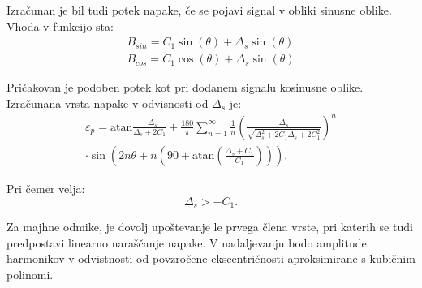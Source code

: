 Izračunan je bil tudi potek napake, če se pojavi signal v obliki sinusne oblike. Vhoda v funkcijo sta:
\begin{eqnarray}
\label{ys_analit}
B_{sin} = C_1 \sin(\theta) + \Delta_s \sin(\theta) \\
B_{cos} = C_1 \cos(\theta) + \Delta_s \sin(\theta)
\end{eqnarray}

Pričakovan je podoben potek kot pri dodanem signalu kosinusne oblike.
Izračunana vrsta napake v odvisnosti od  $\Delta_s$ je:
\begin{equation}
	\label{vrsta:ys}\begin{split}
	\varepsilon_p = \mathrm{atan}\frac{-\Delta_s}{\Delta_s+2C_1}+\frac{180}{\pi} \sum_{n=1}^{\infty}\frac{1}{n} (\frac{\Delta_s}{\sqrt{\Delta_s^2+2 C_1 \Delta_s+2C_1^2}})^n\\
	\cdot \sin (2n \theta+n (90+ \mathrm{ atan}(\frac{\Delta_s+C_1}{C_1}))).\end{split}
\end{equation}

 Pri čemer velja:
$$\Delta_s > -C_1.$$

Za majhne odmike, je dovolj upoštevanje le prvega člena vrste, pri katerih se tudi predpostavi linearno naraščanje napake. V nadaljevanju bodo amplitude harmonikov v odvistnosti od povzročene ekscentričnosti
aproksimirane s kubičnim polinomi.